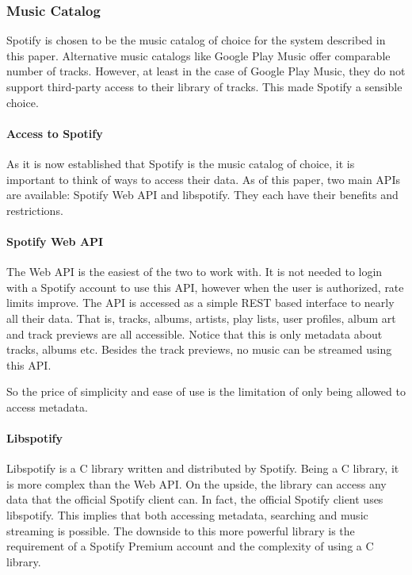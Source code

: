 \subsubsection{Music Catalog}
\label{ssub:Music_catalog}


Spotify is chosen to be the music catalog of choice for the system described in this paper. Alternative music catalogs like Google Play Music offer comparable number of tracks. However, at least in the case of Google Play Music, they do not support third-party access to their library of tracks. This made Spotify a sensible choice.

\paragraph{Access to Spotify}
\label{par:Access_to_Spotify}

As it is now established that Spotify is the music catalog of choice, it is important to think of ways to access their data. As of this paper, two main APIs are available: Spotify Web API and libspotify. They each have their benefits and restrictions.

\paragraph{Spotify Web API}
\label{par:spotify_web_api}

The Web API is the easiest of the two to work with. It is not needed to login with a Spotify account to use this API, however when the user is authorized, rate limits improve. The API is accessed as a simple REST based interface to nearly all their data. That is, tracks, albums, artists, play lists, user profiles, album art and track previews are all accessible. Notice that this is only metadata about tracks, albums etc. Besides the track previews, no music can be streamed using this API.

So the price of simplicity and ease of use is the limitation of only being allowed to access metadata. 

\paragraph{Libspotify}
\label{par:music_catalog_libspotify}

Libspotify is a C library written and distributed by Spotify. Being a C library, it is more complex than the Web API. On the upside, the library can access any data that the official Spotify client can. In fact, the official Spotify client uses libspotify. This implies that both accessing metadata, searching and music streaming is possible. The downside to this more powerful library is the requirement of a Spotify Premium account and the complexity of using a C library.

